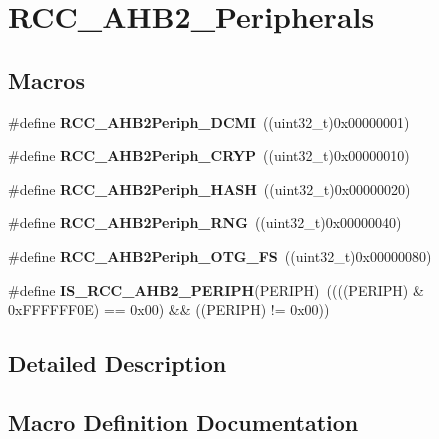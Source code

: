\section{R\+C\+C\+\_\+\+A\+H\+B2\+\_\+\+Peripherals}
\label{group__RCC__AHB2__Peripherals}
\subsection*{Macros}
\begin{DoxyCompactItemize}
\item 
\#define \textbf{ R\+C\+C\+\_\+\+A\+H\+B2\+Periph\+\_\+\+D\+C\+MI}~((uint32\+\_\+t)0x00000001)
\item 
\#define \textbf{ R\+C\+C\+\_\+\+A\+H\+B2\+Periph\+\_\+\+C\+R\+YP}~((uint32\+\_\+t)0x00000010)
\item 
\#define \textbf{ R\+C\+C\+\_\+\+A\+H\+B2\+Periph\+\_\+\+H\+A\+SH}~((uint32\+\_\+t)0x00000020)
\item 
\#define \textbf{ R\+C\+C\+\_\+\+A\+H\+B2\+Periph\+\_\+\+R\+NG}~((uint32\+\_\+t)0x00000040)
\item 
\#define \textbf{ R\+C\+C\+\_\+\+A\+H\+B2\+Periph\+\_\+\+O\+T\+G\+\_\+\+FS}~((uint32\+\_\+t)0x00000080)
\item 
\#define \textbf{ I\+S\+\_\+\+R\+C\+C\+\_\+\+A\+H\+B2\+\_\+\+P\+E\+R\+I\+PH}(P\+E\+R\+I\+PH)~((((P\+E\+R\+I\+PH) \& 0x\+F\+F\+F\+F\+F\+F0\+E) == 0x00) \&\& ((\+P\+E\+R\+I\+P\+H) != 0x00))
\end{DoxyCompactItemize}


\subsection{Detailed Description}


\subsection{Macro Definition Documentation}
\mbox{\label{group__RCC__AHB2__Peripherals_ga90f3f337a5f503e36280ab4504d31c39}} 
